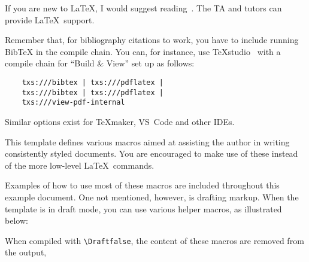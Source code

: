\label{Ch:Introduction}


If you are new to \LaTeX{}, I would suggest reading~\cite{Oetiker_2015}.  The TA and tutors can provide \LaTeX\ support.

Remember that, for bibliography citations to work, you have to include running Bib\TeX{} in the compile chain.  You can, for instance, use TeXstudio~\cite{TeXstudio} with a compile chain for ``Build \& View'' set up as follows:

\begin{verbatim}
    txs:///bibtex | txs:///pdflatex |
    txs:///bibtex | txs:///pdflatex |
    txs:///view-pdf-internal
\end{verbatim}

Similar options exist for TeXmaker, VS~Code and other IDEs.


This template defines various macros aimed at assisting the author in writing consistently styled documents.  You are encouraged to make use of these instead of the more low-level \LaTeX\ commands.

Examples of how to use most of these macros are included throughout this example document.  One not mentioned, however, is drafting markup.  When the template is in draft mode, you can use various helper macros, as illustrated below:

      When compiled with \verb|\Draftfalse|, the content of these macros are removed from the output, 





